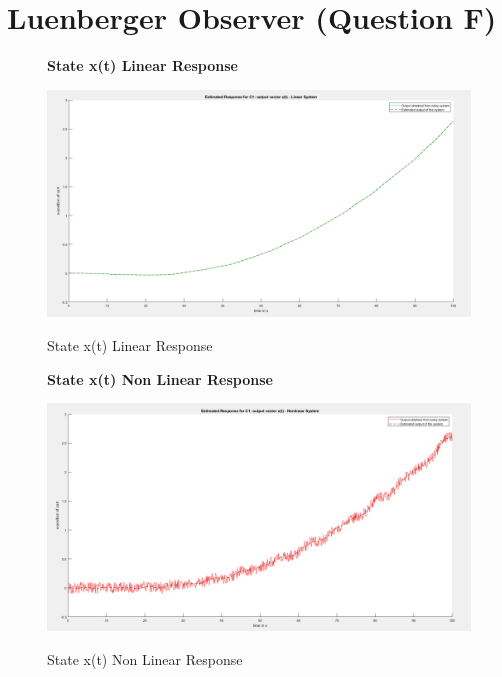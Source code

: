 \documentclass[12pt]{article}
\begin{document}
\section{Luenberger Observer (Question F)}
\begin{figure}[H]
    \centering
    \textbf{State x(t) Linear Response}\par\medskip
    \includegraphics[scale = 0.35]{StateXlinearResponse.png}\\[0.0 cm]	%
    \caption{State x(t) Linear Response} 
\end{figure}

\begin{figure}[H]
    \centering
    \textbf{State x(t) Non Linear Response}\par\medskip
    \includegraphics[scale = 0.35]{StateXNonLinearResponse.png}\\[0.0 cm]	%
    \caption{State x(t) Non Linear Response} 
\end{figure}
\end{document}
